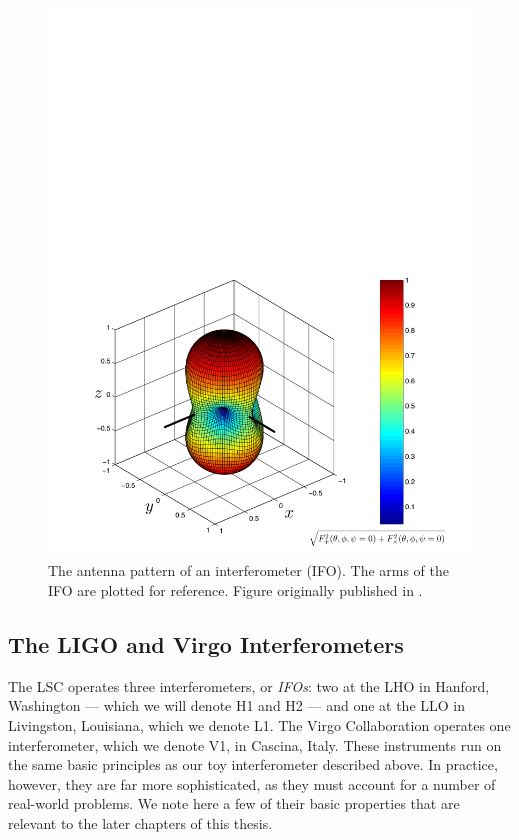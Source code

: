 \begin{figure}[p]
\center
\includegraphics[width=6in]{figures/beampattern.pdf}
\caption{The antenna pattern of an interferometer (IFO). The arms of the IFO are plotted for reference. Figure originally published in \cite{Brown}.}
\label{fig:antenna_pattern}
\end{figure}

\subsection{The LIGO and Virgo Interferometers}
\label{sec:ligovirgo_interferometers}

The \ac{LSC} operates three interferometers, or \emph{IFOs}: two at the \ac{LHO} in Hanford, Washington --- which we will denote H1 and H2 --- and one at the \ac{LLO} in Livingston, Louisiana, which we denote L1. The Virgo Collaboration operates one interferometer, which we denote V1, in Cascina, Italy. These instruments run on the same basic principles as our toy interferometer described above. In practice, however, they are far more sophisticated, as they must account for a number of real-world problems. We note here a few of their basic properties that are relevant to the later chapters of this thesis.

